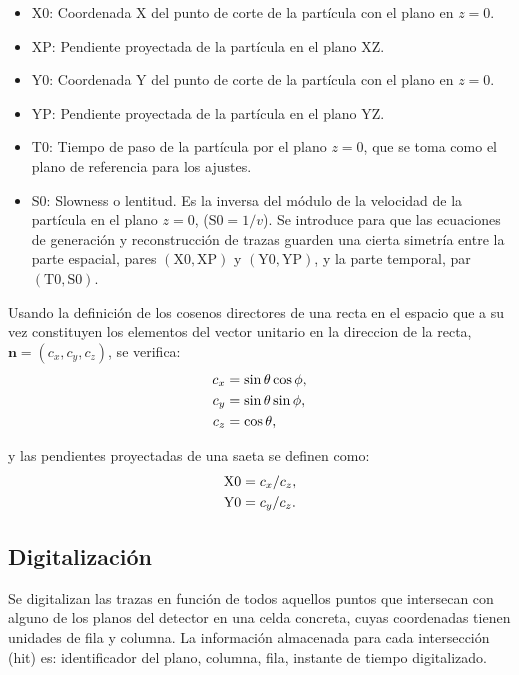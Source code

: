 \documentclass[a4paper]{article}
\let\vec\mathbf  %
\begin{document}
\begin{itemize}
    \item X0:  Coordenada X del punto de corte de la partícula con el plano en $z=0$.
    \item XP:  Pendiente proyectada de la partícula en el plano XZ.
    \item Y0:  Coordenada Y del punto de corte de la partícula con el plano en $z=0$.
    \item YP:  Pendiente proyectada de la partícula en el plano YZ.
    \item T0:  Tiempo de paso de la partícula por el plano $z=0$, que se toma como el plano de referencia para los ajustes.
    \item S0:  Slowness o lentitud. Es la inversa del módulo de la velocidad de la partícula en el plano $z=0$,   ($\mathrm{S0} = 1/v$). Se introduce para que las ecuaciones de generación y reconstrucción de trazas guarden una cierta simetría entre la parte espacial, pares $(\mathrm{X0}, \mathrm{XP})$ y $(\mathrm{Y0}, \mathrm{YP})$, y la parte temporal, par $(\mathrm{T0}, \mathrm{S0})$. 
\end{itemize}
    
Usando la definición de los cosenos directores de una recta en el espacio que a su vez constituyen los elementos del vector unitario  en la direccion de la recta, $\vec{n} = (c_x, c_y, c_z)$, se verifica: 
\begin{align}
    \notag
    c_x & = \sin \theta \cos \phi, \\
    c_y & = \sin \theta \sin \phi, \\
    \notag
    c_z & = \cos \theta,
\end{align}

y las pendientes proyectadas de una saeta se definen como:
\begin{align}
    \notag
    \mathrm{X0}& = c_x / c_z, \\
    \mathrm{Y0}& = c_y / c_z.
    \label{eq:proj}
\end{align}



\subsection{Digitalización}

Se digitalizan las trazas en función de todos aquellos puntos que intersecan con alguno de los planos del detector en una celda concreta, cuyas coordenadas tienen unidades de fila y columna. La información almacenada para cada intersección (hit) es: identificador del plano, columna, fila, instante de tiempo digitalizado.
\end{document}
